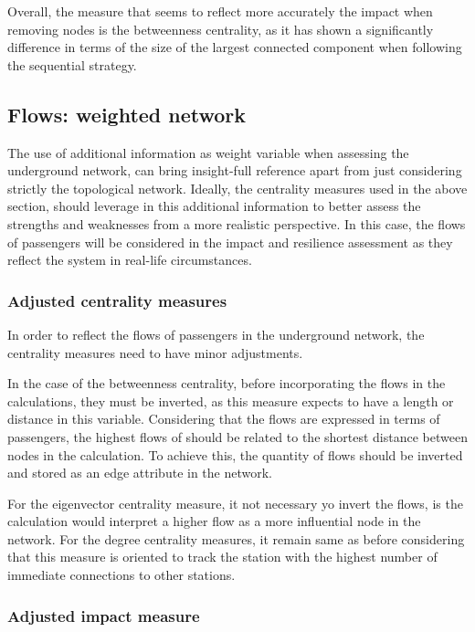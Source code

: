\documentclass{article}
\begin{document}
Overall, the measure that seems to reflect more accurately the impact when removing nodes is the betweenness centrality, as it has shown a significantly difference in terms of the size of the largest connected component when following the sequential strategy.

\subsection{Flows: weighted network}

The use of additional information as weight variable when assessing the underground network, can bring insight-full reference apart from just considering strictly the topological network. Ideally, the centrality measures used in the above section, should leverage in this additional information to better assess the strengths and weaknesses from a more realistic perspective. In this case, the flows of passengers will be considered in the impact and resilience assessment as they reflect the system in real-life circumstances.

\subsubsection{Adjusted centrality measures}

In order to reflect the flows of passengers in the underground network, the centrality measures need to have minor adjustments.

In the case of the betweenness centrality, before incorporating the flows in the calculations, they must be inverted, as this measure expects to have a length or distance in this variable. Considering that the flows are expressed in terms of passengers, the highest flows of should be related to the shortest distance between nodes in the calculation. To achieve this, the quantity of flows should be inverted and stored as an edge attribute in the network.

For the eigenvector centrality measure, it not necessary yo invert the flows, is the calculation would interpret a higher flow as a more influential node in the network. For the degree centrality measures, it remain same as before considering that this measure is oriented to track the station with the highest number of immediate connections to other stations.



\subsubsection{Adjusted impact measure}
\end{document}
